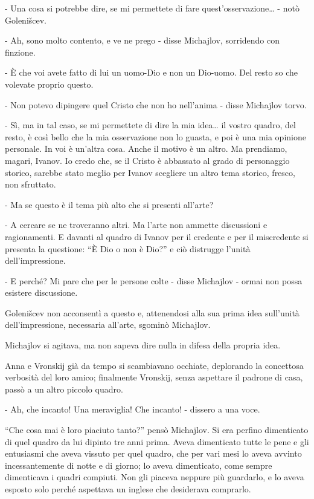 - Una cosa si potrebbe dire, se mi permettete di fare quest'osservazione\ldots{} - notò Golenišcev. 

- Ah, sono molto contento, e ve ne prego - disse Michajlov, sorridendo con finzione. 

- È che voi avete fatto di lui un uomo-Dio e non un Dio-uomo. Del resto so che volevate proprio questo. 

- Non potevo dipingere quel Cristo che non ho nell'anima - disse Michajlov torvo. 

- Sì, ma in tal caso, se mi permettete di dire la mia idea\ldots{} il vostro quadro, del resto, è così bello che la mia osservazione non lo guasta, e poi è una mia opinione personale. In voi è un'altra cosa. Anche il motivo è un altro. Ma prendiamo, magari, Ivanov. Io credo che, se il Cristo è abbassato al grado di personaggio storico, sarebbe stato meglio per Ivanov scegliere un altro tema storico, fresco, non sfruttato. 

- Ma se questo è il tema più alto che si presenti all'arte? 

- A cercare se ne troveranno altri. Ma l'arte non ammette discussioni e ragionamenti. E davanti al quadro di Ivanov per il credente e per il miscredente si presenta la questione: ``È Dio o non è Dio?'' e ciò distrugge l'unità dell'impressione. 

- E perché? Mi pare che per le persone colte - disse Michajlov - ormai non possa esistere discussione. 

Golenišcev non acconsentì a questo e, attenendosi alla sua prima idea sull'unità dell'impressione, necessaria all'arte, sgominò Michajlov. 

Michajlov si agitava, ma non sapeva dire nulla in difesa della propria idea. 

\label{xii-4} 

Anna e Vronskij già da tempo si scambiavano occhiate, deplorando la concettosa verbosità del loro amico; finalmente Vronskij, senza aspettare il padrone di casa, passò a un altro piccolo quadro. 

- Ah, che incanto! Una meraviglia! Che incanto! - dissero a una voce. 

``Che cosa mai è loro piaciuto tanto?'' pensò Michajlov. Si era perfino dimenticato di quel quadro da lui dipinto tre anni prima. Aveva dimenticato tutte le pene e gli entusiasmi che aveva vissuto per quel quadro, che per vari mesi lo aveva avvinto incessantemente di notte e di giorno; lo aveva dimenticato, come sempre dimenticava i quadri compiuti. Non gli piaceva neppure più guardarlo, e lo aveva esposto solo perché aspettava un inglese che desiderava comprarlo. 

